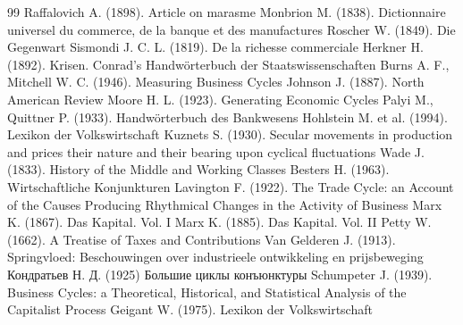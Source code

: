 \begin{RaggedRight}
\begin{thebibliography}{99}
     \hypertarget{bib:Raffalovich-1898}{} Raffalovich A. (1898). Article on marasme
     \hypertarget{bib:Monbrion-1838}{} Monbrion M. (1838). Dictionnaire universel du commerce, de la banque et des manufactures
     \hypertarget{bib:Roscher-1849}{} Roscher W. (1849). Die Gegenwart
     \hypertarget{bib:Sismondi-1819}{} Sismondi J. C. L. (1819). De la richesse commerciale
     \hypertarget{bib:Herkner-1892}{} Herkner H. (1892). Krisen. Conrad's Handwörterbuch der Staatswissenschaften
     \hypertarget{bib:Burns-1946}{} Burns A. F., Mitchell W. C. (1946). Measuring Business Cycles
     \hypertarget{bib:Johnson-1887}{} Johnson J. (1887). North American Review
     \hypertarget{bib:Moore-1923}{} Moore H. L. (1923). Generating Economic Cycles
     \hypertarget{bib:Palyi-1933}{} Palyi M., Quittner P. (1933). Handwörterbuch des Bankwesens
     \hypertarget{bib:Hohlstein-1994}{} Hohlstein M. et al. (1994). Lexikon der Volkswirtschaft
     \hypertarget{bib:Kuznets-1930}{} Kuznets S. (1930). Secular movements in production and prices their nature and their bearing upon cyclical fluctuations
     \hypertarget{bib:Wade-1833}{} Wade J. (1833). History of the Middle and Working Classes
     \hypertarget{bib:Besters-1963}{} Besters H. (1963). Wirtschaftliche Konjunkturen
     \hypertarget{bib:Lavington-1922}{} Lavington F. (1922). The Trade Cycle: an Account of the Causes Producing Rhythmical Changes in the Activity of Business
     \hypertarget{bib:Marx-1867}{} Marx K. (1867). Das Kapital. Vol. I
     \hypertarget{bib:Marx-1885}{} Marx K. (1885). Das Kapital. Vol. II
     \hypertarget{bib:Petty-1662}{} Petty W. (1662). A Treatise of Taxes and Contributions
     \hypertarget{bib:Van-Gelderen-1913}{} Van Gelderen J. (1913). Springvloed: Beschouwingen over industrieele ontwikkeling en prijsbeweging
     \hypertarget{bib:Кондратьев-1925}{} Кондратьев Н. Д. (1925) Большие циклы конъюнктуры
     \hypertarget{bib:Schumpeter-1939}{} Schumpeter J. (1939). Business Cycles: a Theoretical, Historical, and Statistical Analysis of the Capitalist Process
     \hypertarget{bib:Geigant-1975}{} Geigant W. (1975). Lexikon der Volkswirtschaft

\end{thebibliography}
\end{RaggedRight}
